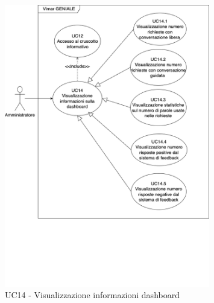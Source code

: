 \begin{figure}[H]
\centering
\includegraphics[width=0.8\textwidth]{contents/casi_duso/png/UC14.png}
\caption{UC14 - Visualizzazione informazioni dashboard}
\end{figure}


